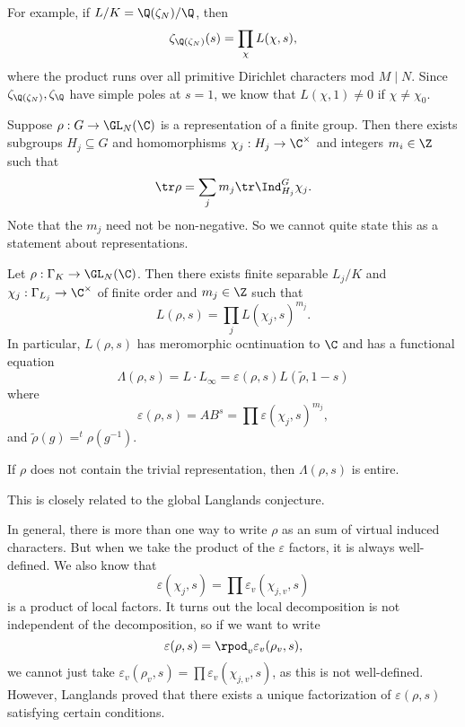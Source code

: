 \documentclass[a4paper]{article}
\begin{document}
\begin{eg}
  For example, if $L/K = \Q(\zeta_N)/\Q$, then
  \[
    \zeta_{\Q(\zeta_N)}(s) = \prod_{\chi} L(\chi, s),
  \]
  where the product runs over all primitive Dirichlet characters mod $M \mid N$. Since $\zeta_{\Q(\zeta_N)}, \zeta_\Q$ have simple poles at $s = 1$, we know that $L(\chi, 1) \not= 0$ if $\chi \not= \chi_0$.
\end{eg}

\begin{thm}
  Suppose $\rho: G \to \GL_N(\C)$ is a representation of a finite group. Then there exists subgroups $H_j \subseteq G$ and homomorphisms $\chi_j: H_j \to \C^\times$ and integers $m_i \in \Z$ such that
  \[
    \tr \rho = \sum_j m_j \tr \Ind_{H_j}^G \chi_j.
  \]
  Note that the $m_j$ need not be non-negative. So we cannot quite state this as a statement about representations.
\end{thm}

\begin{cor}
  Let $\rho: \Gamma_K \to \GL_N(\C)$. Then there exists finite separable $L_j/K$ and $\chi_j: \Gamma_{L_j} \to \C^\times$ of finite order and $m_j \in \Z$ such that
  \[
    L(\rho, s) = \prod_j L(\chi_j, s)^{m_j}.
  \]
  In particular, $L(\rho, s)$ has meromorphic ocntinuation to $\C$ and has a functional equation
  \[
    \Lambda(\rho, s) = L \cdot L_\infty = \varepsilon(\rho, s) L(\tilde{\rho}, 1 - s)
  \]
  where 
  \[
    \varepsilon(\rho, s) = A B^s = \prod \varepsilon(\chi_j, s)^{m_j},
  \]
  and $\tilde{\rho}(g) = ^t \rho(g^{-1})$.
\end{cor}

\begin{conjecture}
  If $\rho$ does not contain the trivial representation, then $\Lambda(\rho, s)$ is entire.
\end{conjecture}
This is closely related to the global Langlands conjecture.

In general, there is more than one way to write $\rho$ as an sum of virtual induced characters. But when we take the product of the $\varepsilon$ factors, it is always well-defined. We also know that
\[
  \varepsilon(\chi_j, s) = \prod \varepsilon_v(\chi_{j, v}, s)
\]
is a product of local factors. It turns out the local decomposition is not independent of the decomposition, so if we want to write
\[
  \varepsilon(\rho, s) = \rpod_v \varepsilon_v(\rho_v, s),
\]
we cannot just take $\varepsilon_v(\rho_v, s) = \prod \varepsilon_v(\chi_{j, v}, s)$, as this is not well-defined. However, Langlands proved that there exists a unique factorization of $\varepsilon(\rho, s)$ satisfying certain conditions.
\end{document}
